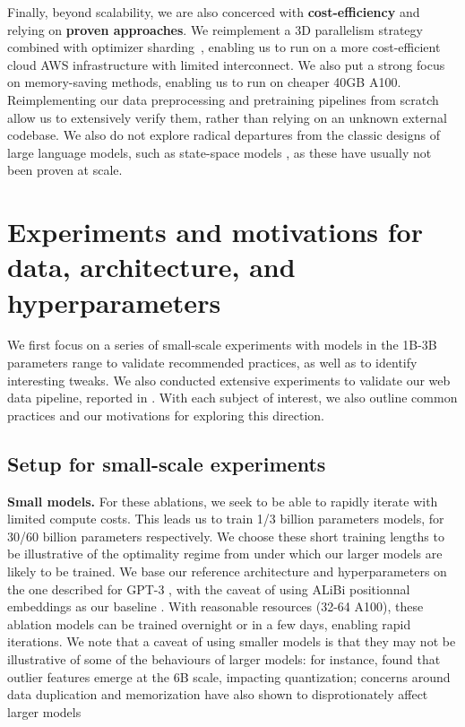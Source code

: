 \documentclass{article}
\begin{document}
Finally, beyond scalability, we are also concerced with \textbf{cost-efficiency} and relying on \textbf{proven approaches}. We reimplement a 3D parallelism strategy \citep{megatron-2} combined with optimizer sharding~\citep{zero-msft}, enabling us to run on a more cost-efficient cloud AWS infrastructure with limited interconnect. We also put a strong focus on memory-saving methods, enabling us to run on cheaper 40GB A100. Reimplementing our data preprocessing and pretraining pipelines from scratch allow us to extensively verify them, rather than relying on an unknown external codebase. We also do not explore radical departures from the classic designs of large language models, such as state-space models \citep{fu2022hungry}, as these have usually not been proven at scale.


\section{Experiments and motivations for data, architecture, and hyperparameters}
\label{sec:ablations}
\vspace{-0.1in}

We first focus on a series of small-scale experiments with models in the 1B-3B parameters range to validate recommended practices, as well as to identify interesting tweaks. We also conducted extensive experiments to validate our web data pipeline, reported in \citet{refinedweb}. With each subject of interest, we also outline common practices and our motivations for exploring this direction.
\vspace{-0.2in}

\subsection{Setup for small-scale experiments}
\label{sec:ablations-setup}

\textbf{Small models.} For these ablations, we seek to be able to rapidly iterate with limited compute costs. This leads us to train 1/3 billion parameters models, for 30/60 billion parameters respectively. We choose these short training lengths to be illustrative of the optimality regime from \citet{hoffmann2022training} under which our larger models are likely to be trained. We base our reference architecture and hyperparameters on the one described for GPT-3 \citep{brown2020gpt3}, with the caveat of using ALiBi positionnal embeddings as our baseline \citep{press2021alibi}. With reasonable resources (32-64 A100), these ablation models can be trained overnight or in a few days, enabling rapid iterations. We note that a caveat of using smaller models is that they may not be illustrative of some of the behaviours of larger models: for instance, \citet{dettmers2022gpt3} found that outlier features emerge at the 6B scale, impacting quantization; concerns around data duplication and memorization have also shown to disprotionately affect larger models \citep{carlini2022quantifying, hernandez2022scaling}
\end{document}
